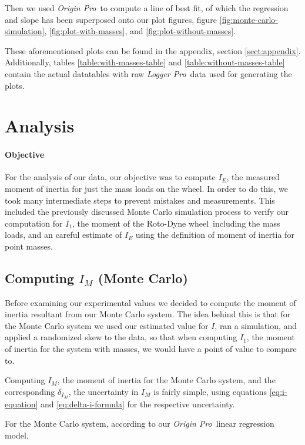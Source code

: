\documentclass[coverpage]{article}
\newcommand{\softwareText}[1]{\textit{#1}\texttrademark}
\newcommand{\loggerpro}{\softwareText{Logger Pro}}
\newcommand{\origin}{\softwareText{Origin Pro}}
\newcommand{\rwheel}{Roto-Dyne wheel}
\begin{document}
	Then we used \origin~to compute a line of best fit, of which the regression and slope has been superposed onto our plot figures, figure \ref{fig:monte-carlo-simulation}, \ref{fig:plot-with-masses}, and \ref{fig:plot-without-masses}.
	
	These aforementioned plots can be found in the appendix, section \ref{sect:appendix}. Additionally, tables \ref{table:with-masses-table} and \ref{table:without-masses-table} contain the actual datatables with raw \loggerpro~data used for generating the plots.
	
	\section{Analysis}
	
	\paragraph{Objective}
	
	For the analysis of our data, our objective was to compute $I_E$, the measured moment of inertia for just the mass loads on the wheel. In order to do this, we took many intermediate steps to prevent mistakes and measurements. This included the previously discussed Monte Carlo simulation process to verify our computation for $I_1$, the moment of the \rwheel~including the mass loads, and an careful estimate of $I_E$ using the definition of moment of inertia for point masses.
	
	\subsection{Computing $I_M$ (Monte Carlo)}
	
	Before examining our experimental values we decided to compute the moment of inertia resultant from our Monte Carlo system. The idea behind this is that for the Monte Carlo system we used our estimated value for $I$, ran a simulation, and applied a randomized skew to the data, so that when computing $I_1$, the moment of inertia for the system with masses, we would have a point of value to compare to.

	Computing $I_M$, the moment of inertia for the Monte Carlo system, and the corresponding $\delta_{I_M}$, the uncertainty in $I_M$ is fairly simple, using equations \ref{eq:i-equation} and \ref{eq:delta-i-formula} for the respective uncertainty.
	
	For the Monte Carlo system, according to our \origin~linear regression model,
	
\end{document}
